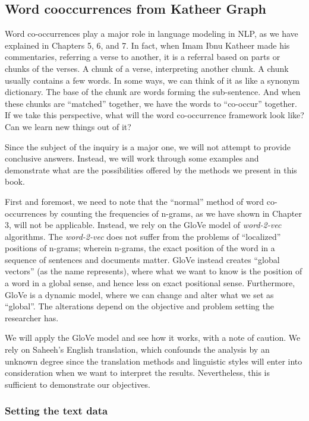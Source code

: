 \documentclass[
]{article}
\begin{document}
\hypertarget{word-cooccurrences-from-Katheer-graph}{%
\subsection{Word cooccurrences from Katheer Graph}\label{word-cooccurrences-from-Katheer-graph}}

Word co-occurrences play a major role in language modeling in NLP, as we have explained in Chapters 5, 6, and 7. In fact, when Imam Ibnu Katheer made his commentaries, referring a verse to another, it is a referral based on parts or chunks of the verses. A chunk of a verse, interpreting another chunk. A chunk usually contains a few words. In some ways, we can think of it as like a synonym dictionary. The base of the chunk are words forming the sub-sentence. And when these chunks are ``matched'' together, we have the words to ``co-occur'' together. If we take this perspective, what will the word co-occurrence framework look like? Can we learn new things out of it?

Since the subject of the inquiry is a major one, we will not attempt to provide conclusive answers. Instead, we will work through some examples and demonstrate what are the possibilities offered by the methods we present in this book.

First and foremost, we need to note that the ``normal'' method of word co-occurrences by counting the frequencies of n-grams, as we have shown in Chapter 3, will not be applicable. Instead, we rely on the GloVe model of \emph{word-2-vec} algorithms. The \emph{word-2-vec} does not suffer from the problems of ``localized'' positions of n-grams; wherein n-grams, the exact position of the word in a sequence of sentences and documents matter. GloVe instead creates ``global vectors'' (as the name represents), where what we want to know is the position of a word in a global sense, and hence less on exact positional sense. Furthermore, GloVe is a dynamic model, where we can change and alter what we set as ``global''. The alterations depend on the objective and problem setting the researcher has.

We will apply the GloVe model and see how it works, with a note of caution. We rely on Saheeh's English translation, which confounds the analysis by an unknown degree since the translation methods and linguistic styles will enter into consideration when we want to interpret the results. Nevertheless, this is sufficient to demonstrate our objectives.

\hypertarget{setting-the-text-data}{%
\subsubsection{Setting the text data}\label{setting-the-text-data}}
\end{document}
